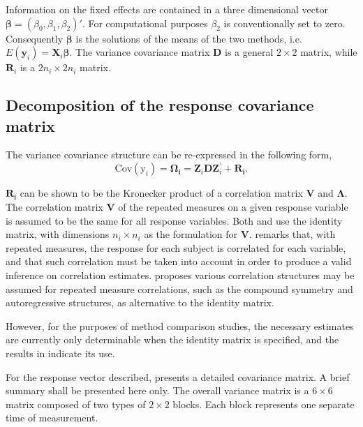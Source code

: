 \documentclass[12pt, a4paper]{report}
\theoremstyle{plain}
\theoremstyle{definition}
\theoremstyle{remark}
\begin{document}
	Information on the fixed effects are contained in a three dimensional vector $\boldsymbol{\beta} = (\beta_{0},\beta_{1},\beta_{2})\prime$. For computational purposes $\beta_{2}$ is conventionally set to zero. Consequently $\boldsymbol{\beta}$ is the solutions of the means of the two methods, i.e. $E(\boldsymbol{y}_{i})  = \boldsymbol{X}_{i}\boldsymbol{\beta}$. The variance covariance matrix $\boldsymbol{D}$ is a general $2 \times 2$ matrix, while $\boldsymbol{R}_{i}$ is a $2n_{i} \times 2n_{i}$ matrix.
	
	\subsection{Decomposition of the response covariance matrix}
	
	The variance covariance structure can be re-expressed in the following form,
	\[
	\mbox{Cov}(\mbox{y}_{i}) = \boldsymbol{\Omega_{i}} = \boldsymbol{Z}_{i}\boldsymbol{D}\boldsymbol{Z}_{i}^\prime + \boldsymbol{R_{i}}.
	\]
	
	$\boldsymbol{R_{i}}$ can be shown to be the Kronecker product of a correlation matrix $\boldsymbol{V}$ and $\boldsymbol{\Lambda}$. The correlation matrix $\boldsymbol{V}$ of the repeated measures on a given response variable is assumed to be the same for all response variables. Both \citet{hamlett} and \citet{lam} use the identity matrix, with dimensions $n_{i} \times n_{i}$ as the formulation for $\boldsymbol{V}$. \citet{ARoy2009} remarks that, with repeated measures, the response for each subject is correlated for each variable, and that such correlation must be taken into account in order to produce a valid inference on correlation estimates.  \citet{ARoy20092006} proposes various correlation structures may be assumed for repeated measure correlations, such as the compound symmetry and autoregressive structures, as alternative to the identity matrix.
	
	However, for the purposes of method comparison studies, the necessary estimates are currently only determinable when the identity matrix is specified, and the results in \citet{ARoy2009} indicate its use.
	
	For the response vector described, \citet{hamlett} presents a detailed covariance matrix. A brief summary shall be presented here only. The overall variance matrix is a $6 \times 6$ matrix composed of two types of $2 \times 2$ blocks. Each block represents one separate time of measurement.
	
\end{document}
